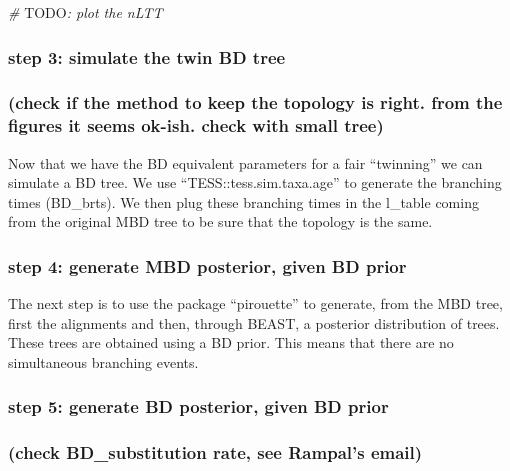 \documentclass[]{article}
\newenvironment{Shaded}{\begin{snugshade}}{\end{snugshade}}
\newcommand{\CommentTok}[1]{\textcolor[rgb]{0.56,0.35,0.01}{\textit{#1}}}
\newcommand{\AlertTok}[1]{\textcolor[rgb]{0.94,0.16,0.16}{#1}}
\begin{document}
\begin{Shaded}
\begin{Highlighting}[]
\CommentTok{# }\AlertTok{TODO}\CommentTok{: plot the nLTT}
\end{Highlighting}
\end{Shaded}

\subsubsection{step 3: simulate the twin BD
tree}\label{step-3-simulate-the-twin-bd-tree}

\subsubsection{(check if the method to keep the topology is right. from
the figures it seems ok-ish. check with small
tree)}\label{check-if-the-method-to-keep-the-topology-is-right.-from-the-figures-it-seems-ok-ish.-check-with-small-tree}

Now that we have the BD equivalent parameters for a fair ``twinning'' we
can simulate a BD tree. We use ``TESS::tess.sim.taxa.age'' to generate
the branching times (BD\_brts). We then plug these branching times in
the l\_table coming from the original MBD tree to be sure that the
topology is the same.

\subsubsection{step 4: generate MBD posterior, given BD
prior}\label{step-4-generate-mbd-posterior-given-bd-prior}

The next step is to use the package ``pirouette'' to generate, from the
MBD tree, first the alignments and then, through BEAST, a posterior
distribution of trees. These trees are obtained using a BD prior. This
means that there are no simultaneous branching events.

\subsubsection{step 5: generate BD posterior, given BD
prior}\label{step-5-generate-bd-posterior-given-bd-prior}

\subsubsection{(check BD\_substitution rate, see Rampal's
email)}\label{check-bd_substitution-rate-see-rampals-email}
\end{document}
